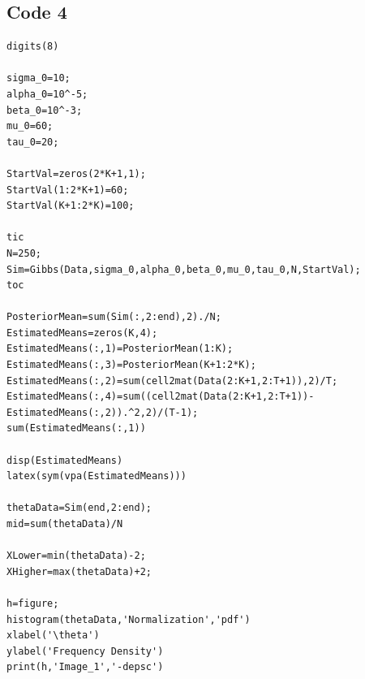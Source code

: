\documentclass[10pt,a4paper,notitlepage]{article}
\begin{document}
\pagebreak
\subsection*{\centering Code 4}\label{cd:3}
\begin{verbatim}
digits(8)

sigma_0=10;
alpha_0=10^-5;
beta_0=10^-3;
mu_0=60;
tau_0=20;

StartVal=zeros(2*K+1,1);
StartVal(1:2*K+1)=60;
StartVal(K+1:2*K)=100;

tic
N=250;
Sim=Gibbs(Data,sigma_0,alpha_0,beta_0,mu_0,tau_0,N,StartVal);
toc

PosteriorMean=sum(Sim(:,2:end),2)./N;
EstimatedMeans=zeros(K,4);
EstimatedMeans(:,1)=PosteriorMean(1:K);
EstimatedMeans(:,3)=PosteriorMean(K+1:2*K);
EstimatedMeans(:,2)=sum(cell2mat(Data(2:K+1,2:T+1)),2)/T;
EstimatedMeans(:,4)=sum((cell2mat(Data(2:K+1,2:T+1))-EstimatedMeans(:,2)).^2,2)/(T-1);
sum(EstimatedMeans(:,1))

disp(EstimatedMeans)
latex(sym(vpa(EstimatedMeans)))

thetaData=Sim(end,2:end);
mid=sum(thetaData)/N

XLower=min(thetaData)-2;
XHigher=max(thetaData)+2;

h=figure;
histogram(thetaData,'Normalization','pdf')
xlabel('\theta')
ylabel('Frequency Density')
print(h,'Image_1','-depsc')

\end{verbatim}

\pagebreak
\end{document}
